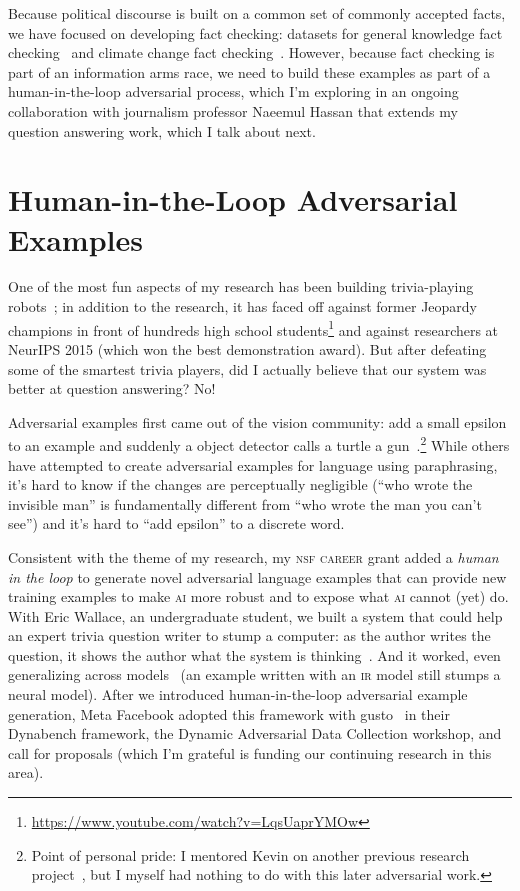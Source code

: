 \documentclass[11pt]{amsart}
\newcommand{\abr}[1]{\textsc{#1}}
\begin{document}
Because political discourse is built on a common set of commonly
accepted facts, we have focused on developing fact checking: datasets
for general knowledge fact checking~\cite{eisenschlos-21} and climate
change fact checking~\cite{Diggelmann-20}.
%
However, because fact checking is part of an information arms race, we
need to build these examples as part of a human-in-the-loop
adversarial process, which I'm exploring in an ongoing collaboration
with journalism professor Naeemul Hassan that extends my question
answering work, which I talk about next.

\section{Human-in-the-Loop Adversarial Examples}

One of the most fun aspects of my research has been building
trivia-playing robots~\cite{boyd-graber-12,iyyer-14b,iyyer-15}; in
addition to the research, it has faced off against former Jeopardy
champions in front of hundreds high school
students\footnote{\url{https://www.youtube.com/watch?v=LqsUaprYMOw}}
and against researchers at NeurIPS 2015 (which won the best
demonstration award).
%
But after defeating some of the smartest trivia players, did I
actually believe that our system was better at question answering?
%
No!

Adversarial examples first came out of the vision community: add a
small epsilon to an example and suddenly a object detector calls a
turtle a gun~\cite{athalye-18}.\footnote{Point of personal pride: I
mentored Kevin on another previous research project~\cite{he-16}, but
I myself had nothing to do with this later adversarial work.}
%
While others have attempted to create adversarial examples for
language using paraphrasing, it's hard to know if the changes are
perceptually negligible (``who wrote the invisible man'' is
fundamentally different from ``who wrote the man you can't see'') and
it's hard to ``add epsilon'' to a discrete word.

Consistent with the theme of my research, my \abr{nsf career} grant
added a \emph{human in the loop} to generate novel adversarial
language examples that can provide new training examples to make
\abr{ai} more robust and to expose what \abr{ai} cannot (yet) do.
%
With Eric Wallace, an undergraduate student, we built a system that
could help an expert trivia question writer to stump a computer: as
the author writes the question, it shows the author what the system is
thinking~\cite{wallace-18}.
%
And it worked, even generalizing across models~\cite{wallace-19} (an
example written with an \abr{ir} model still stumps a neural model).
%
After we introduced human-in-the-loop adversarial example generation,
Meta Facebook adopted this framework with gusto~\cite{bartolo-20} in
their Dynabench framework, the Dynamic Adversarial Data Collection
workshop, and call for proposals (which I'm grateful is funding our
continuing research in this area).
\end{document}
